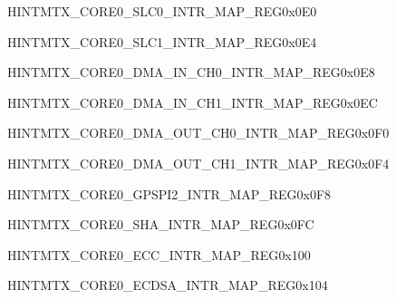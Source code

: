 \begin{register}{H}{INTMTX\_CORE0\_SLC0\_INTR\_MAP\_REG}{0x0E0}\label{regdesc:INTMTXCORE0SLC0INTRMAPREG} \end{register}\vspace{-3em}
\begin{register}{H}{INTMTX\_CORE0\_SLC1\_INTR\_MAP\_REG}{0x0E4}\label{regdesc:INTMTXCORE0SLC1INTRMAPREG} \end{register}\vspace{-3em}
\begin{register}{H}{INTMTX\_CORE0\_DMA\_IN\_CH0\_INTR\_MAP\_REG}{0x0E8}\label{regdesc:INTMTXCORE0DMAINCH0INTRMAPREG} \end{register}\vspace{-3em}
\begin{register}{H}{INTMTX\_CORE0\_DMA\_IN\_CH1\_INTR\_MAP\_REG}{0x0EC}\label{regdesc:INTMTXCORE0DMAINCH1INTRMAPREG} \end{register}\vspace{-3em}
\begin{register}{H}{INTMTX\_CORE0\_DMA\_OUT\_CH0\_INTR\_MAP\_REG}{0x0F0}\label{regdesc:INTMTXCORE0DMAOUTCH0INTRMAPREG} \end{register}\vspace{-3em}
\begin{register}{H}{INTMTX\_CORE0\_DMA\_OUT\_CH1\_INTR\_MAP\_REG}{0x0F4}\label{regdesc:INTMTXCORE0DMAOUTCH1INTRMAPREG} \end{register}\vspace{-3em}
\begin{register}{H}{INTMTX\_CORE0\_GPSPI2\_INTR\_MAP\_REG}{0x0F8}\label{regdesc:INTMTXCORE0GPSPI2INTRMAPREG} \end{register}\vspace{-3em}
\begin{register}{H}{INTMTX\_CORE0\_SHA\_INTR\_MAP\_REG}{0x0FC}\label{regdesc:INTMTXCORE0SHAINTRMAPREG} \end{register}\vspace{-3em}
\begin{register}{H}{INTMTX\_CORE0\_ECC\_INTR\_MAP\_REG}{0x100}\label{regdesc:INTMTXCORE0ECCINTRMAPREG} \end{register}\vspace{-3em}
\begin{register}{H}{INTMTX\_CORE0\_ECDSA\_INTR\_MAP\_REG}{0x104}\label{regdesc:INTMTXCORE0ECDSAINTRMAPREG} \end{register}\vspace{-3em}


